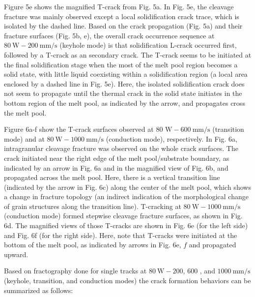 \documentclass[10pt]{article}
\begin{document}
Figure 5e shows the magnified T-crack from Fig. 5a. In Fig. 5e, the cleavage fracture was mainly observed except a local solidification crack trace, which is isolated by the dashed line. Based on the crack propagation (Fig. 5a) and their fracture surfaces (Fig. 5b, e), the overall crack occurrence sequence at $80 \mathrm{~W}-200 \mathrm{~mm} / \mathrm{s}$ (keyhole mode) is that solidification L-crack occurred first, followed by a T-crack as an secondary crack. The T-crack seems to be initiated at the final solidification stage when the most of the melt pool region becomes a solid state, with little liquid coexisting within a solidification region (a local area enclosed by a dashed line in Fig. 5e). Here, the isolated solidification crack does not seem to propagate until the thermal crack in the solid state initiates in the bottom region of the melt pool, as indicated by the arrow, and propagates cross the melt pool.

Figure 6a-f show the T-crack surfaces observed at 80 $\mathrm{W}-600 \mathrm{~mm} / \mathrm{s}$ (transition mode) and at $80 \mathrm{~W}-1000 \mathrm{~mm} / \mathrm{s}$ (conduction mode), respectively. In Fig. 6a, intragranular cleavage fracture was observed on the whole crack surfaces. The crack initiated near the right edge of the melt pool/substrate boundary, as indicated by an arrow in Fig. 6a and in the magnified view of Fig. 6b, and propagated across the melt pool. Here, there is a vertical transition line (indicated by the arrow in Fig. 6c) along the center of the melt pool, which shows a change in fracture topology (an indirect indication of the morphological change of grain structures along the transition line). T-cracking at $80 \mathrm{~W}-1000 \mathrm{~mm} / \mathrm{s}$ (conduction mode) formed stepwise cleavage fracture surfaces, as shown in Fig. 6d. The magnified views of those T-cracks are shown in Fig. 6e (for the left side) and Fig. 6f (for the right side). Here, note that T-cracks were initiated at the bottom of the melt pool, as indicated by arrows in Fig. 6e, $f$ and propagated upward.

Based on fractography done for single tracks at $80 \mathrm{~W}-200$, 600 , and $1000 \mathrm{~mm} / \mathrm{s}$ (keyhole, transition, and conduction modes) the crack formation behaviors can be summarized as follows:
\end{document}
